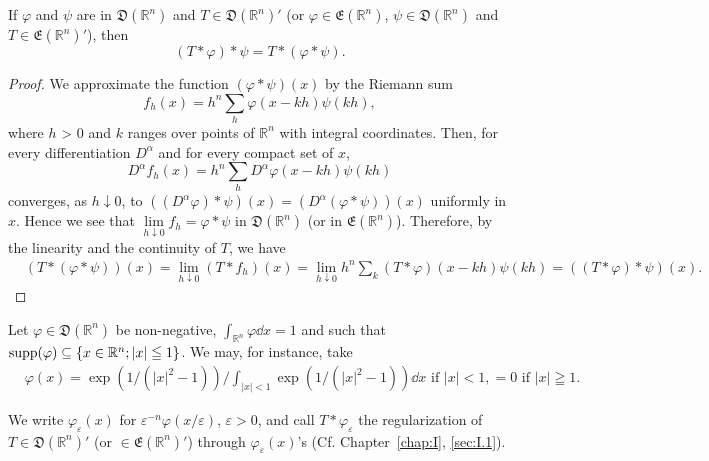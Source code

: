 \begin{proposition}\label{prop:VI.3.Proposition.2} If $\varphi$ and $\psi$ are in $\mathfrak{D}(\mathbb{R}^{n})$ and $T \in \mathfrak{D}(\mathbb{R}^{n})'$ (or $\varphi \in \mathfrak{E}(\mathbb{R}^{n})$, $\psi \in \mathfrak{D}(\mathbb{R}^{n})$ and $T \in \mathfrak{E}(\mathbb{R}^{n})'$), then 
\begin{equation}\label{eq:VI.3.4}
(T * \varphi) * \psi = T * (\varphi * \psi).
\end{equation}
\end{proposition}

\begin{proof}
 We approximate the function $(\varphi * \psi)(x)$ by the Riemann sum 
\[
f _{h} (x) = h ^{n} \sum\limits_{h} \varphi (x - k h) \psi (k h),
\]
where $h$ > $0$ and $k$ ranges over points of $\mathbb{R}^{n}$ with integral coordinates. Then, for every differentiation $D^{\alpha}$ and for every compact set of $x$, 
\[
D ^{\alpha} f _{h} (x) = h ^{n} \sum\limits_{h} D ^{\alpha} \varphi (x - k h) \psi (k h)
\]
converges, as $h \downarrow 0$, to $((D^{\alpha}\varphi) * \psi)(x) = (D^{\alpha}(\varphi * \psi))(x)$ uniformly in $x$. Hence we see that $\lim\limits_{h \downarrow 0} f_h = \varphi * \psi$ in $\mathfrak{D}(\mathbb{R}^{n})$ (or in $\mathfrak{E}(\mathbb{R}^{n})$). Therefore, by the linearity and the continuity of $T$, we have 
\[ \begin{aligned}
&(T * (\varphi * \psi)) (x)  = \lim\limits _{h \downarrow 0} (T * f _{h}) (x) = \lim\limits _{h \downarrow 0} h ^{n} \sum\limits_{k} (T * \varphi) (x - k h) \psi (k h) = ((T * \varphi) * \psi) (x).
\end{aligned}
\]
\end{proof}

\begin{definitionu} Let $\varphi \in \mathfrak{D}(\mathbb{R}^{n})$ be non-negative, $\int_{\mathbb{R}^{n}}\varphi \dd x = 1$ and such that $\operatorname{supp}(\varphi) \subseteq \{x \in \mathbb{R}^{n}; |x| \leqq 1\}$. We may, for instance, take 
\[
\begin{aligned}
&\varphi (x) = \exp (1 / (| x | ^{2} - 1)) / \int_{|x|<1} \exp (1 / (| x | ^{2} - 1)) \dd x \text{ if } | x | < 1, = 0 \text{ if } | x | \geqq 1.
\end{aligned}
\]
\end{definitionu}

We write $\varphi_{\varepsilon}(x)$ for $\varepsilon^{-n}\varphi(x/\varepsilon)$, $\varepsilon > 0$, and call $T * \varphi_{\varepsilon}$ the regularization of $T \in \mathfrak{D}(\mathbb{R}^{n})'$ (or $\in \mathfrak{E}(\mathbb{R}^{n})'$) through $\varphi_{\varepsilon}(x)$'s (Cf. Chapter~\ref{chap:I}, \ref{sec:I.1}). 


